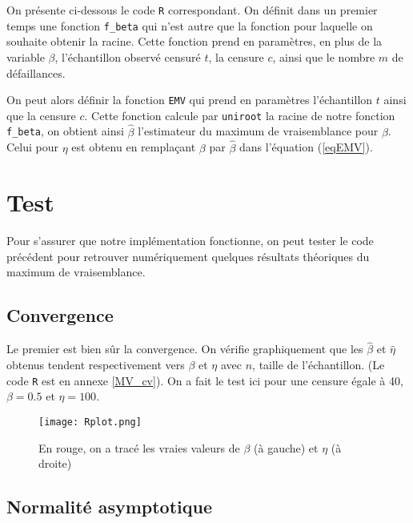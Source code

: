 \documentclass[a4paper]{report}
\begin{document}
On présente ci-dessous le code \verb|R| correspondant. On définit dans un premier temps une fonction \verb|f_beta| qui n'est autre que la fonction pour laquelle on souhaite obtenir la racine. Cette fonction prend en paramètres, en plus de la variable $\beta$, l'échantillon observé censuré $t$, la censure $c$, ainsi que le nombre $m$ de défaillances.

 On peut alors définir la fonction \verb|EMV| qui prend en paramètres l'échantillon $t$ ainsi que la censure $c$. Cette fonction calcule par \verb|uniroot| la racine de notre fonction \verb|f_beta|, on obtient ainsi $\hat{\beta}$ l'estimateur du maximum de vraisemblance pour $\beta$. Celui pour $\eta$ est obtenu en remplaçant $\beta$ par $\hat{\beta}$ dans l'équation (\ref{eqEMV}). 


     
\section{Test}

Pour s'assurer que notre implémentation fonctionne, on peut tester le code précédent pour retrouver numériquement quelques résultats théoriques du maximum de vraisemblance.     
    
\subsection{Convergence}

Le premier est bien sûr la convergence. On vérifie graphiquement que les $\hat{\beta}$ et $\hat{\eta}$ obtenus tendent respectivement vers $\beta$ et $\eta$ avec $n$, taille de l'échantillon. (Le code \verb|R| est en annexe \ref{MV_cv}). On a fait le test ici pour une censure égale à 40, $\beta = 0.5$ et $\eta=100$.

 \begin{figure}[!ht]
	\centering
     	\texttt{[image: Rplot.png]}

	\caption{En rouge, on a tracé les vraies valeurs de $\beta$ (à gauche) et $\eta$ (à droite)}
\end{figure}

\subsection{Normalité asymptotique}
\end{document}
